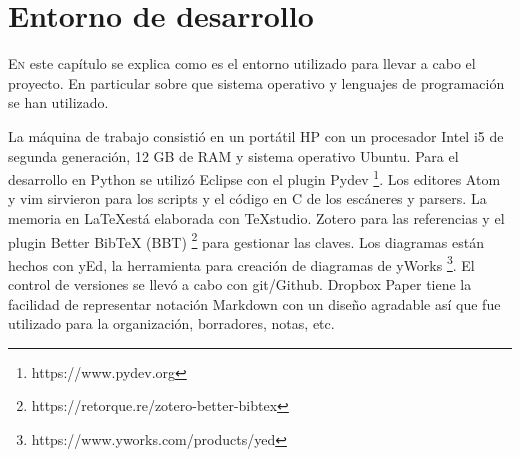 
\chapter{Entorno de desarrollo}
\label{chap:entorno-desarrollo}

\lettrine{E}n este capítulo se explica como es el entorno utilizado para llevar a cabo el proyecto. En particular sobre que sistema operativo y lenguajes de programación se han utilizado.

La máquina de trabajo consistió en un portátil HP con un procesador Intel i5 de segunda generación, 12 GB de RAM y sistema operativo Ubuntu. Para el desarrollo en Python se utilizó Eclipse con el plugin Pydev
\footnote{https://www.pydev.org}. Los editores Atom y vim sirvieron para los scripts y el código en C de los escáneres y parsers. La memoria en \LaTeX está elaborada con TeXstudio. Zotero para las referencias y el plugin Better BibTeX (BBT) 
\footnote{https://retorque.re/zotero-better-bibtex} para gestionar las claves. Los diagramas están hechos con yEd, la herramienta para creación de diagramas de yWorks 
\footnote{https://www.yworks.com/products/yed}. El control de versiones se llevó a cabo con git/Github. Dropbox Paper tiene la facilidad de representar notación Markdown con un diseño agradable así que fue utilizado para la organización, borradores, notas, etc.
